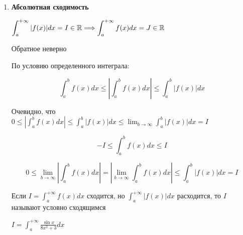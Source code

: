 \documentclass[12pt]{article}
\begin{document}
\begin{enumerate}[label*=\textbf{\arabic** }]
\begin{MyProof}
            По свойству определенного интеграла: $\displaystyle \int^{b}_{a} (k - \varepsilon)g(x) dx < \int^{b}_{a} f(x) dx < \int^{b}_{a} (k + \varepsilon)g(x) dx$

            В пределе $\displaystyle \lim_{b \to +\infty}$: $\displaystyle (k - \varepsilon) \int^{+\infty}_{a} g(x) dx < \int^{+\infty}_{a} f(x) dx < (k + \varepsilon) \int^{+\infty}_{a} g(x) dx$

            Если $I = \infty$ (но $k - \varepsilon \neq 0$), то по первому признаку (линейность) $J$ расходится, что следует из правого неравенства

            Если $I \in \Real$ ($k + \varepsilon \neq \infty$), то по первому признаку (линейность) $J$ сходится, что следует из левого неравенства
        \end{MyProof}

        \hypertarget{improperintegralabsoluteconvergence}{}
        \item \textbf{Абсолютная сходимость}

        \begin{MyTheorem}
            $\displaystyle \int^{+\infty}_{a} |f(x)| dx = I \in \mathbb{R} \Longrightarrow \int^{+\infty}_{a} f(x) dx = J \in \mathbb{R}$
        \end{MyTheorem}

        \Nota Обратное неверно

        \begin{MyProof}
            По условию определенного интеграла:

            \[\int^{b}_{a} f(x) dx \leq \left|\int^{b}_{a} f(x) dx\right| \leq \int^{b}_{a} |f(x)| dx\]

            Очевидно, что $\displaystyle 0 \leq \left|\int^{b}_{a} f(x) dx\right| \leq \int^{b}_{a} |f(x)| dx \leq \lim_{b \to \infty} \int^{b}_{a} |f(x)| dx = I$

            \[-I \leq \int^{b}_{a} f(x) dx \leq I\]

            \[0 \leq \lim_{b \to \infty} \left|\int^{b}_{a} f(x) dx\right| = \left|\lim_{b \to \infty} \int^{b}_{a} f(x) dx\right| \leq \int^{b}_{a} |f(x)| dx = I\]
        \end{MyProof}

        \Nota \hypertarget{improperintegralconditionalconvergence}{}Если $\displaystyle I = \int^{+\infty}_{a} f(x) dx$ сходится, но $\displaystyle \int^{+\infty}_{a} |f(x)| dx$ расходится, то $I$ называют условно сходящимся

        \Ex $\displaystyle I = \int^{+\infty}_{a} \frac{\sin x}{8x^2 + 3} dx$


\end{enumerate}
\end{document}
